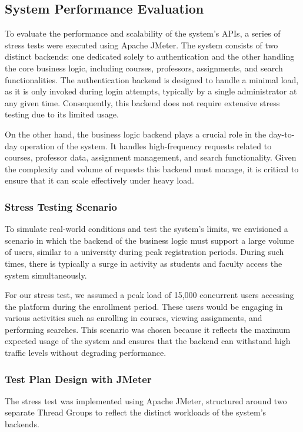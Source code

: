 \documentclass[12pt,a4paper]{article}
\begin{document}
\subsection{System Performance Evaluation}
To evaluate the performance and scalability of the system’s APIs, a series of stress tests were executed using Apache JMeter. The system consists of two distinct backends: one dedicated solely to authentication and the other handling the core business logic, including courses, professors, assignments, and search functionalities. The authentication backend is designed to handle a minimal load, as it is only invoked during login attempts, typically by a single administrator at any given time. Consequently, this backend does not require extensive stress testing due to its limited usage.

On the other hand, the business logic backend plays a crucial role in the day-to-day operation of the system. It handles high-frequency requests related to courses, professor data, assignment management, and search functionality. Given the complexity and volume of requests this backend must manage, it is critical to ensure that it can scale effectively under heavy load.

\subsubsection{Stress Testing Scenario}
To simulate real-world conditions and test the system's limits, we envisioned a scenario in which the backend of the business logic must support a large volume of users, similar to a university during peak registration periods. During such times, there is typically a surge in activity as students and faculty access the system simultaneously.

For our stress test, we assumed a peak load of 15,000 concurrent users accessing the platform during the enrollment period. These users would be engaging in various activities such as enrolling in courses, viewing assignments, and performing searches. This scenario was chosen because it reflects the maximum expected usage of the system and ensures that the backend can withstand high traffic levels without degrading performance.

\subsubsection{Test Plan Design with JMeter}
The stress test was implemented using Apache JMeter, structured around two separate Thread Groups to reflect the distinct workloads of the system’s backends.
\end{document}
